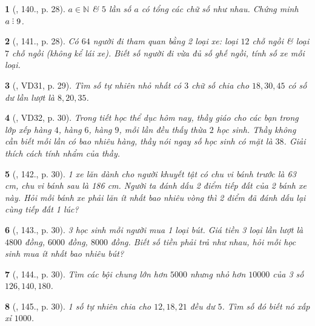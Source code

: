 \documentclass{article}
\newtheorem{baitoan}{}
\DeclareRobustCommand{\divby}{%
	\mathrel{\vbox{\baselineskip.65ex\lineskiplimit0pt\hbox{.}\hbox{.}\hbox{.}}}%
}
\begin{document}
\begin{baitoan}[\cite{Tuyen_Toan_6}, 140., p. 28]
	$a\in\mathbb{N}$ \& $5$ lần số $a$ có tổng các chữ số như nhau. Chứng minh $a\divby9$.
\end{baitoan}

\begin{baitoan}[\cite{Tuyen_Toan_6}, 141., p. 28]
	Có $64$ người đi tham quan bằng 2 loại xe: loại $12$ chỗ ngồi \& loại $7$ chỗ ngồi (không kể lái xe). Biết số người đi vừa đủ số ghế ngồi, tính số xe mỗi loại.
\end{baitoan}

\begin{baitoan}[\cite{Tuyen_Toan_6}, VD31, p. 29]
	Tìm số tự nhiên nhỏ nhất có $3$ chữ số chia cho $18,30,45$ có số dư lần lượt là $8,20,35$.
\end{baitoan}

\begin{baitoan}[\cite{Tuyen_Toan_6}, VD32, p. 30]
	Trong tiết học thể dục hôm nay, thầy giáo cho các bạn trong lớp xếp hàng $4$, hàng $6$, hàng $9$, mỗi lần đều thấy thừa $2$ học sinh. Thầy không cần biết mỗi lần có bao nhiêu hàng, thầy nói ngay số học sinh có mặt là $38$. Giải thích cách tính nhẩm của thầy.
\end{baitoan}

\begin{baitoan}[\cite{Tuyen_Toan_6}, 142., p. 30]
	1 xe lăn dành cho người khuyết tật có chu vi bánh trước là {\rm63 cm}, chu vi bánh sau là {\rm186 cm}. Người ta đánh dấu 2 điểm tiếp đất của 2 bánh xe này. Hỏi mỗi bánh xe phải lăn ít nhất bao nhiêu vòng thì 2 điểm đã đánh dấu lại cùng tiếp đất 1 lúc?
\end{baitoan}

\begin{baitoan}[\cite{Tuyen_Toan_6}, 143., p. 30]
	3 học sinh mỗi người mua 1 loại bút. Giá tiền 3 loại lần lượt là $4800$ đồng, $6000$ đồng, $8000$ đồng. Biết số tiền phải trả như nhau, hỏi mỗi học sinh mua ít nhất bao nhiêu bút?
\end{baitoan}

\begin{baitoan}[\cite{Tuyen_Toan_6}, 144., p. 30]
	Tìm các bội chung lớn hơn $5000$ nhưng nhỏ hơn $10000$ của 3 số $126,140,180$.
\end{baitoan}

\begin{baitoan}[\cite{Tuyen_Toan_6}, 145., p. 30]
	1 số tự nhiên chia cho $12,18,21$ đều dư $5$. Tìm số đó biết nó xấp xỉ $1000$.
\end{baitoan}
\end{document}
